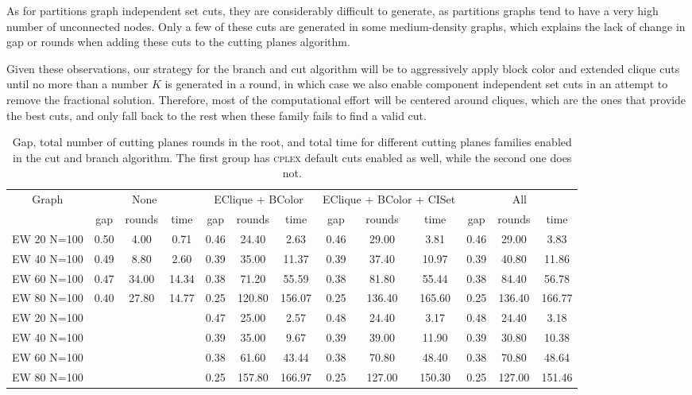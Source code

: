 As for partitions graph independent set cuts, they are considerably difficult to generate, as partitions graphs tend to have a very high number of unconnected nodes. Only a few of these cuts are generated in some medium-density graphs, which explains the lack of change in gap or rounds when adding these cuts to the cutting planes algorithm.

Given these observations, our strategy for the branch and cut algorithm will be to aggressively apply block color and extended clique cuts until no more than a number $K$ is generated in a round, in which case we also enable component independent set cuts in an attempt to remove the fractional solution. Therefore, most of the computational effort will be centered around cliques, which are the ones that provide the best cuts, and only fall back to the rest when these family fails to find a valid cut.

\begin{sidewaystable}[h]
\centering

\begin{tabular}{|c|ccc|ccc|ccc|ccc|}
\hline
\multicolumn{1}{|c|}{Graph} & \multicolumn{3}{|c|}{None} & \multicolumn{3}{|c|}{EClique + BColor} & \multicolumn{3}{|c|}{EClique + BColor + CISet} & \multicolumn{3}{|c|}{All}
\\
 & gap & rounds & time & gap & rounds & time & gap & rounds & time & gap & rounds & time
\\
\hline
EW 20 N=100 & 0.50 & 4.00 & 0.71 & 0.46 & 24.40 & 2.63 & 0.46 & 29.00 & 3.81 & 0.46 & 29.00 & 3.83
\\
EW 40 N=100 & 0.49 & 8.80 & 2.60 & 0.39 & 35.00 & 11.37 & 0.39 & 37.40 & 10.97 & 0.39 & 40.80 & 11.86
\\
EW 60 N=100 & 0.47 & 34.00 & 14.34 & 0.38 & 71.20 & 55.59 & 0.38 & 81.80 & 55.44 & 0.38 & 84.40 & 56.78
\\
EW 80 N=100 & 0.40 & 27.80 & 14.77 & 0.25 & 120.80 & 156.07 & 0.25 & 136.40 & 165.60 & 0.25 & 136.40 & 166.77
\\
\hline 
EW 20 N=100 & & & & 0.47 & 25.00 & 2.57 & 0.48 & 24.40 & 3.17 & 0.48 & 24.40 & 3.18
\\
EW 40 N=100 & & & & 0.39 & 35.00 & 9.67 & 0.39 & 39.00 & 11.90 & 0.39 & 30.80 & 10.38
\\
EW 60 N=100 & & & & 0.38 & 61.60 & 43.44 & 0.38 & 70.80 & 48.40 & 0.38 & 70.80 & 48.64
\\
EW 80 N=100 & & & & 0.25 & 157.80 & 166.97 & 0.25 & 127.00 & 150.30 & 0.25 & 127.00 & 151.46
\\
\hline
 \end{tabular}

\caption{Gap, total number of cutting planes rounds in the root, and total time for different cutting planes families enabled in the cut and branch algorithm. The first group has \textsc{cplex} default cuts enabled as well, while the second one does not.}
\label{table:cuts:times}

\end{sidewaystable}

